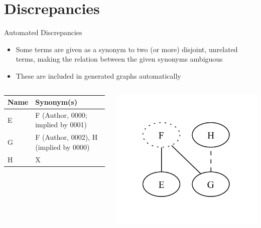 \documentclass{beamer}
\begin{document}
\section{Discrepancies}
\begin{frame}{Automated Discrepancies}
    \begin{itemize}
        \item Some terms are given as a synonym to two (or more) disjoint,
              unrelated terms, making the relation between the given synonyms
              ambiguous \pause
        \item These are included in generated graphs automatically
    \end{itemize}
    \vspace{-0.5cm}
    \begin{columns}[c]
        \begin{column}{.55\textwidth}
            \small
            \begin{table}[hbtp!]
                \centering
                \begin{tabular}{ll} \hline
                    Name & Synonym(s)                            \\ \hline
                    E    & F (Author, 0000; implied by 0001)     \\
                    G    & F (Author, 0002), H (implied by 0000) \\
                    H    & X                                     \\ \hline
                \end{tabular}
            \end{table}
        \end{column}
        \begin{column}{.4\textwidth}
            \includegraphics[width=\textwidth]{assets/graphs/SynExampleGlossaryGraph.pdf}

\end{column}
\end{columns}
\end{frame}
\end{document}
